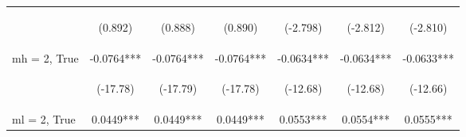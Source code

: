 \documentclass{standalone}
\begin{document}
\begin{tabular}{lcccccc}
    \vspace{4pt}     & \begin{footnotesize}(0.892)\end{footnotesize}   & \begin{footnotesize}(0.888)\end{footnotesize}   & \begin{footnotesize}(0.890)\end{footnotesize}   & \begin{footnotesize}(-2.798)\end{footnotesize} & \begin{footnotesize}(-2.812)\end{footnotesize} & \begin{footnotesize}(-2.810)\end{footnotesize} \\
    mh = 2, True     & -0.0764***                                      & -0.0764***                                      & -0.0764***                                      & -0.0634***                                     & -0.0634***                                     & -0.0633***                                     \\
    \vspace{4pt}     & \begin{footnotesize}(-17.78)\end{footnotesize}  & \begin{footnotesize}(-17.79)\end{footnotesize}  & \begin{footnotesize}(-17.78)\end{footnotesize}  & \begin{footnotesize}(-12.68)\end{footnotesize} & \begin{footnotesize}(-12.68)\end{footnotesize} & \begin{footnotesize}(-12.66)\end{footnotesize} \\
    ml = 2, True     & 0.0449***                                       & 0.0449***                                       & 0.0449***                                       & 0.0553***                                      & 0.0554***                                      & 0.0555***                                      \\

\end{tabular}
\end{document}
